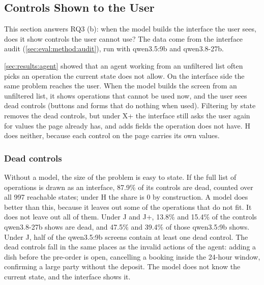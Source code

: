 \FloatBarrier

\subsection{Controls Shown to the User}\label{sec:results:interface}

This section answers RQ3 (b): when the model builds the interface the user sees, does it show controls the user cannot use?
The data come from the interface audit (\autoref{sec:eval:method:audit}), run with qwen3.5:9b and qwen3.8-27b.

\autoref{sec:results:agent} showed that an agent working from an unfiltered list often picks an operation the current state does not allow.
On the interface side the same problem reaches the user.
When the model builds the screen from an unfiltered list, it shows operations that cannot be used now, and the user sees dead controls (buttons and forms that do nothing when used).
Filtering by state removes the dead controls, but under X+ the interface still asks the user again for values the page already has, and adds fields the operation does not have.
H does neither, because each control on the page carries its own values.

\subsubsection{Dead controls}\label{sec:results:dead}

Without a model, the size of the problem is easy to state.
If the full list of operations is drawn as an interface, 87.9\% of its controls are dead, counted over all 997 reachable states; under H the share is 0 by construction.
A model does better than this, because it leaves out some of the operations that do not fit.
It does not leave out all of them.
Under J and J+, 13.8\% and 15.4\% of the controls qwen3.8-27b shows are dead, and 47.5\% and 39.4\% of those qwen3.5:9b shows.
Under J, half of the qwen3.5:9b screens contain at least one dead control.
The dead controls fall in the same places as the invalid actions of the agent: adding a dish before the pre-order is open, cancelling a booking inside the 24-hour window, confirming a large party without the deposit.
The model does not know the current state, and the interface shows it.

